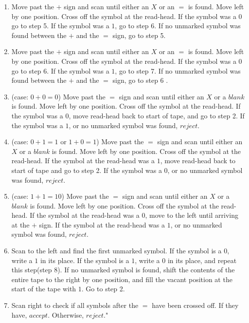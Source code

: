 \documentclass{article}
\begin{document}
\begin{enumerate}[\indent a)]
\begin{enumerate}[\indent 1.]
		
		\item Move past the $+$ sign and scan until either an $X$ or an $=$ is found. Move left by one position. Cross off the symbol at the read-head. If the symbol was a $0$ go to step 5. If the symbol was a $1$, go to step 6. If no unmarked symbol was found between the $+$ and the $=$ sign, go to step 5.
		\item Move past the $+$ sign and scan until either an $X$ or an $=$ is found. Move left by one position. Cross off the symbol at the read-head. If the symbol was a $0$ go to step 6. If the symbol was a $1$, go to step 7. If no unmarked symbol was found between the $+$ and the $=$ sign, go to step 6 .
		
		\item (case: $0 + 0 = 0$) Move past the $=$ sign and scan until either an $X$ or a $blank$ is found. Move left by one position. Cross off the symbol at the read-head. If the symbol was a $0$, move read-head back to start of tape, and go to step 2. If the symbol was a $1$, or no unmarked symbol was found, $reject$.
		
		\item (case: $0 + 1 = 1$ or $1 + 0 = 1$) Move past the $=$ sign and scan until either an $X$ or a $blank$ is found. Move left by one position. Cross off the symbol at the read-head. If the symbol at the read-head was a $1$, move read-head back to start of tape and go to step 2. If the symbol was a $0$, or no unmarked symbol was found, $reject$.
		
		\item (case: $1 + 1 = 10$) Move past the $=$ sign and scan until either an $X$ or a $blank$ is found. Move left by one position. Cross off the symbol at the read-head. If the symbol at the read-head was a $0$, move to the left until arriving at the $+$ sign. If the symbol at the read-head was a $1$, or no unmarked symbol was found, $reject$.
		
		\item Scan to the left and find the first unmarked symbol. If the symbol is a $0$, write a $1$ in its place. If the symbol is a $1$, write a $0$ in its place, and repeat this step(step 8). If no unmarked symbol is found, shift the contents of the entire tape to the right by one position, and fill the vacant position at the start of the tape with $1$. Go to step 2.
		
		\item Scan right to check if all symbols after the $=$ have been crossed off. If they have, $accept$. Otherwise, $reject$."
		 		
    \end{enumerate}

\newpage

\end{enumerate}
\end{document}
